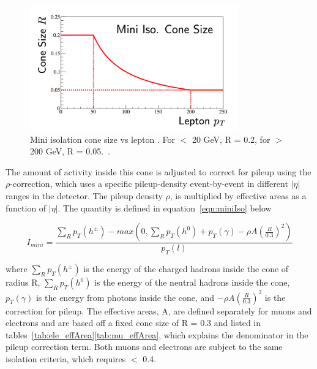 \begin{figure}[hbtp]
 \begin{center}
   \includegraphics[width=0.8\textwidth]{ch4_figs/miniIso.pdf}
   \caption[Mini isolation cone size vs \pt]{Mini isolation cone size vs lepton \pt. For \pt $<$ 20 GeV, R = 0.2, for \pt $>$ 200 GeV, R = 0.05.~\cite{miniIso}.}
   \label{fig:miniIsoConeSize}
 \end{center}
\end{figure}


\noindent The amount of activity inside this cone is adjusted to correct for pileup using the $\rho$-correction, which uses a specific pileup-density event-by-event in different $|\eta|$ ranges in the detector. The
pileup density $\rho$, is multiplied by effective areas as a function of $|\eta|$. The \miniIso quantity is defined in equation~\ref{eqn:miniIso} below

\begin{equation}
\label{eqn:miniIso}
 I_{mini} = \frac{\sum_{R}p_{T}(h^{\pm}) - max(0,\sum_{R}p_{T}(h^{0}) + p_{T}(\gamma) - \rho A (\frac{R}{0.3})^{2}) }{p_{T}(l)}
\end{equation}

\noindent where $\sum_{R}p_{T}(h^{\pm})$ is the energy of the charged hadrons inside the cone of radius R, $\sum_{R}p_{T}(h^{0})$ is the energy of the neutral hadrons inside the cone, $p_{T}(\gamma)$ is
the energy from photons inside the cone, and $-\rho A (\frac{R}{0.3})^{2}$ is the correction for pileup. The effective areas, A, are defined separately for muons and electrons and are based off a fixed
cone size of R = 0.3 and listed in tables~\ref{tab:ele_effArea}\ref{tab:mu_effArea}, which explains the denominator in the pileup correction term. Both muons and electrons are subject to the same isolation criteria,
which requires \miniIso $<$ 0.4.

